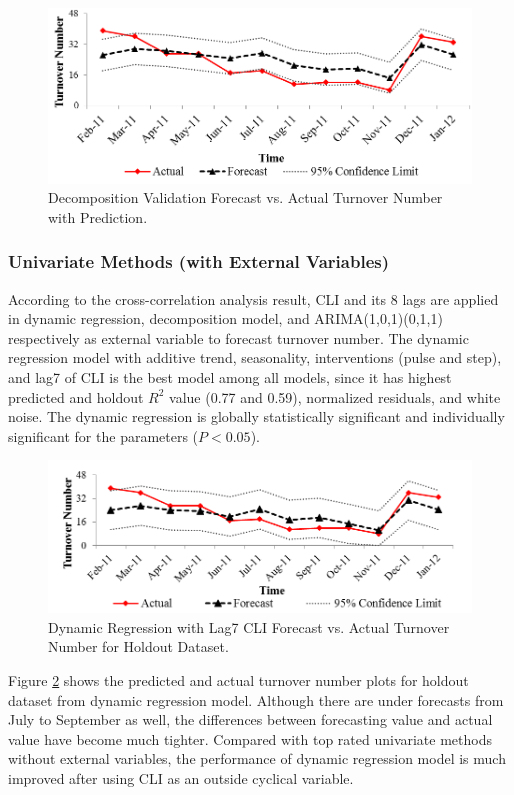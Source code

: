 \begin{figure}
	\centering
	\includegraphics[width=5.5in]{Fig5.png}
	\caption{Decomposition Validation Forecast vs. Actual Turnover Number with Prediction.}
	\label{fig:5}
\end{figure}

\subsubsection{Univariate Methods (with External Variables)}
According to the cross-correlation analysis result, CLI and its 8 lags are applied in dynamic regression, decomposition model, and ARIMA(1,0,1)(0,1,1) respectively as external variable to forecast turnover number. The dynamic regression model with additive trend, seasonality, interventions (pulse and step), and lag7 of CLI is the best model among all models, since it has highest predicted and holdout  $R^2$ value (0.77 and 0.59), normalized residuals, and white noise. The dynamic regression is globally statistically significant and individually significant for the parameters ($P<0.05$).
\begin{figure}
	\centering
	\includegraphics[width=5.5in]{Fig6.png}
	\caption{Dynamic Regression with Lag7 CLI Forecast vs. Actual Turnover Number for Holdout Dataset.}
	\label{fig:6}
\end{figure}
Figure \ref{fig:6} shows the predicted and actual turnover number plots for holdout dataset from dynamic regression model. Although there are under forecasts from July to September as well, the differences between forecasting value and actual value have become much tighter. Compared with top rated univariate methods without external variables, the performance of dynamic regression model is much improved after using CLI as an outside cyclical variable. 

